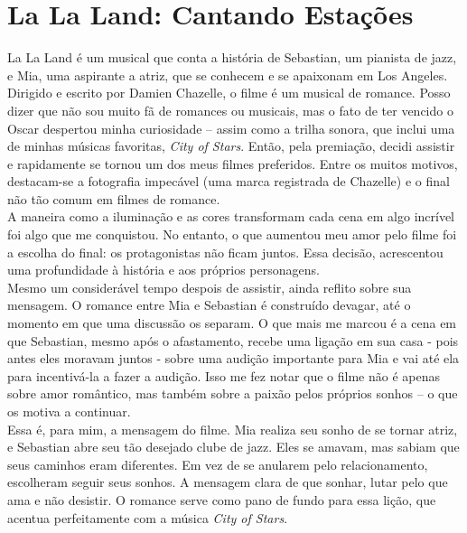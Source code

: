 \documentclass[
    12pt,                  %
    openright,             %
    oneside,               %
    a4paper,               %
    chapter=TITLE,         %
    section=TITLE,         %
    brazil                 %
]{abntex2}                 %
\begin{document}
\chapter*{La La Land: Cantando Estações}
La La Land é um musical que conta a história de Sebastian, um pianista de jazz, e Mia, uma aspirante a atriz, que se conhecem e se apaixonam em Los Angeles. Dirigido e escrito por Damien Chazelle, o filme é um musical de romance. Posso dizer que não sou muito fã de romances ou musicais, mas o fato de ter vencido o Oscar despertou minha curiosidade – assim como a trilha sonora, que inclui uma de minhas músicas favoritas, \textit{City of Stars}. Então, pela premiação, decidi assistir e rapidamente se tornou um dos meus filmes preferidos. Entre os muitos motivos, destacam-se a fotografia impecável (uma marca registrada de Chazelle) e o final não tão comum em filmes de romance. \\ 
\vspace{13px}
\noindent A maneira como a iluminação e as cores transformam cada cena em algo incrível foi algo que me conquistou. No entanto, o que aumentou meu amor pelo filme foi a escolha do final: os protagonistas não ficam juntos. Essa decisão, acrescentou uma profundidade à história e aos próprios personagens. \\ \vspace{0.1px}
\vspace{13px}
\noindent Mesmo um considerável tempo despois de assistir, ainda reflito sobre sua mensagem. O romance entre Mia e Sebastian é construído devagar, até o momento em que uma discussão os separam. O que mais me marcou é a cena em que Sebastian, mesmo após o afastamento, recebe uma ligação em sua casa - pois antes eles moravam juntos - sobre uma audição importante para Mia e vai até ela para incentivá-la a fazer a audição. Isso me fez notar que o filme não é apenas sobre amor romântico, mas também sobre a paixão pelos próprios sonhos – o que os motiva a continuar. \\ \vspace{0.1px}
\vspace{13px}
\noindent Essa é, para mim, a mensagem do filme. Mia realiza seu sonho de se tornar atriz, e Sebastian abre seu tão desejado clube de jazz. Eles se amavam, mas sabiam que seus caminhos eram diferentes. Em vez de se anularem pelo relacionamento, escolheram seguir seus sonhos. A mensagem clara de que sonhar, lutar pelo que ama e não desistir. O romance serve como pano de fundo para essa lição, que acentua perfeitamente com a música  \textit{City of Stars}. \\ 
\end{document}
